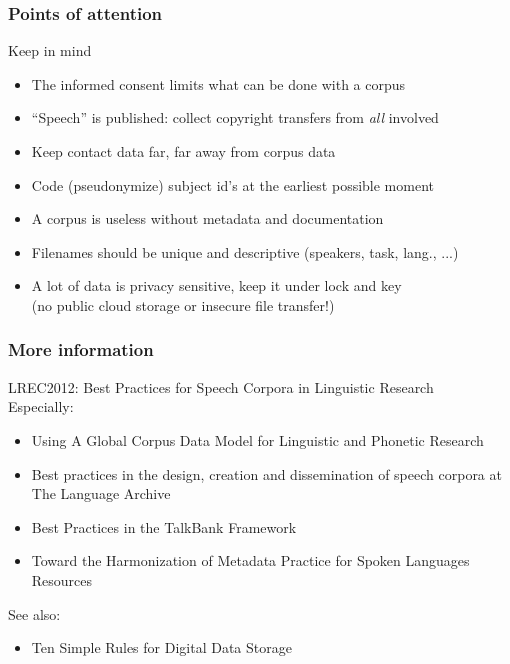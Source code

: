 \documentclass[xcolor=dvipsnames]{beamer}
\begin{document}
\begin{frame}
	\frametitle{Points of attention}
	\begin{block}{Keep in mind}
	\begin{itemize}
	\item {\color{Maroon} The informed consent limits what can be done with a corpus}
	\item {\color{Maroon} ``Speech'' is published: collect copyright transfers from {\em all} involved}
	\item Keep contact data far, far away from corpus data
	\item Code (pseudonymize) subject id's at the earliest possible moment
	\item A corpus is useless without metadata and documentation
	\item Filenames should be unique and descriptive (speakers, task, lang., ...)
	\item A lot of data is privacy sensitive, keep it under lock and key\\
		(no public cloud storage or insecure file transfer!)
	\end{itemize}
	\end{block}
\end{frame}

\begin{frame}
	\frametitle{More information}
	LREC2012: Best Practices for Speech Corpora in Linguistic Research {\scriptsize\cite{BestPractices2012}}\\
	Especially:
	\begin{itemize}
	\item \cite{draxler2012using} Using A Global Corpus Data Model for Linguistic and Phonetic Research  
	\item \cite{drude2012best} Best practices in the design, creation and dissemination of speech corpora at The Language Archive
	\item \cite{macwhinney2012best} Best Practices in the TalkBank Framework
	\item \cite{cieri2012toward} Toward the Harmonization of Metadata Practice for Spoken Languages Resources
	\end{itemize}
	See also:
	\begin{itemize}
	\item \cite{hart2016ten} Ten Simple Rules for Digital Data Storage
	\end{itemize}
	\nocite{vanson2017notes}
\end{frame}
\end{document}
